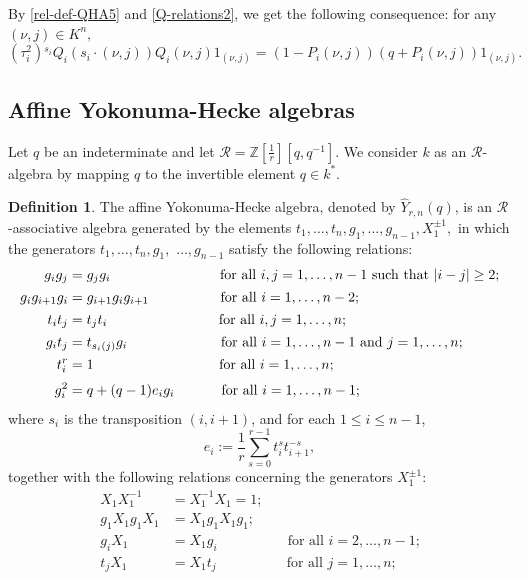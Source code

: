 \documentclass[11pt, reqno]{amsart} \textwidth=14.9cm \oddsidemargin=1cm \evensidemargin=1cm
\theoremstyle{definition}
\newtheorem{definition}[theorem]{Definition}
\numberwithin{equation}{section}
\begin{document}
By \eqref{rel-def-QHA5} and \eqref{Q-relations2}, we get the following consequence: for any $(\nu, j)\in K^{n},$
\begin{equation}
(\tau_{i}^{2}){}^{s_{i}}Q_{i}(s_{i}\cdot(\nu, j))Q_{i}(\nu, j)1_{(\nu, j)}=(1-P_{i}(\nu, j))(q+P_{i}(\nu, j))1_{(\nu, j)}.\label{Q-P-relations}
\end{equation}

\subsection{Affine Yokonuma-Hecke algebras}
Let $q$ be an indeterminate and let $\mathcal{R}=\mathbb{Z}[\frac{1}{r}][q,q^{-1}].$ We consider $k$ as an $\mathcal{R}$-algebra by mapping $q$ to the invertible element $q\in k^{*}.$

\begin{definition}
The affine Yokonuma-Hecke algebra, denoted by $\widehat{Y}_{r,n}(q)$, is an $\mathcal{R}$-associative algebra generated by the elements $t_{1},\ldots,t_{n},g_{1},\ldots,g_{n-1},X_{1}^{\pm1},$ in which the generators $t_{1},\ldots,t_{n},g_{1},$ $\ldots,g_{n-1}$ satisfy the following relations:
\begin{align}
g_ig_j&=g_jg_i \qquad \qquad\qquad\quad\hspace{0.3cm}\mbox{for all $i,j=1,\ldots,n-1$ such that $\vert i-j\vert \geq 2$;}\label{rel-def-Y1}\\[0.1em]
g_ig_{i+1}g_i&=g_{i+1}g_ig_{i+1} \qquad \quad\qquad\hspace{0.05cm}\mbox{for all $i=1,\ldots,n-2$;}\label{rel-def-Y2}\\[0.1em]
t_it_j&=t_jt_i \qquad\qquad\qquad\qquad  \mbox{for all $i,j=1,\ldots,n$;}\label{rel-def-Y3}\\[0.1em]
g_it_j&=t_{s_i(j)}g_i \quad \quad\qquad\qquad\hspace{0.25cm}\mbox{for all $i=1,\ldots,n-1$ and $j=1,\ldots,n$;}\label{rel-def-Y4}\\[0.1em]
t_i^r&=1 \quad \qquad\qquad\qquad\qquad\mbox{for all $i=1,\ldots,n$;}\label{rel-def-Y5}\\[0.2em]
g_{i}^{2}&=q+(q-1)e_{i}g_{i} \qquad \hspace{0.48cm}\mbox{for all $i=1,\ldots,n-1$;}\label{rel-def-Y6}
\end{align}
where $s_{i}$ is the transposition $(i,i+1)$, and for each $1\leq i\leq n-1$,
$$e_{i} :=\frac{1}{r}\sum\limits_{s=0}^{r-1}t_{i}^{s}t_{i+1}^{-s},$$
together with the following relations concerning the generators $X_{1}^{\pm1}$:
\begin{align}
X_{1}X_{1}^{-1}&=X_{1}^{-1}X_{1}=1;\label{rel-def-Y7}\\[0.1em]
g_{1}X_{1}g_{1}X_{1}&=X_{1}g_{1}X_{1}g_{1};\label{rel-def-Y8}\\[0.1em]
g_{i}X_{1}&=X_{1}g_{i} \qquad \qquad \quad\mbox{for all $i=2,\ldots,n-1$;}\label{rel-def-Y9}\\[0.1em]
t_{j}X_{1}&=X_{1}t_{j} \qquad \qquad\quad\mbox{for all $j=1,\ldots,n$;}\label{rel-def-Y10}
\end{align}
\end{definition}
\end{document}
